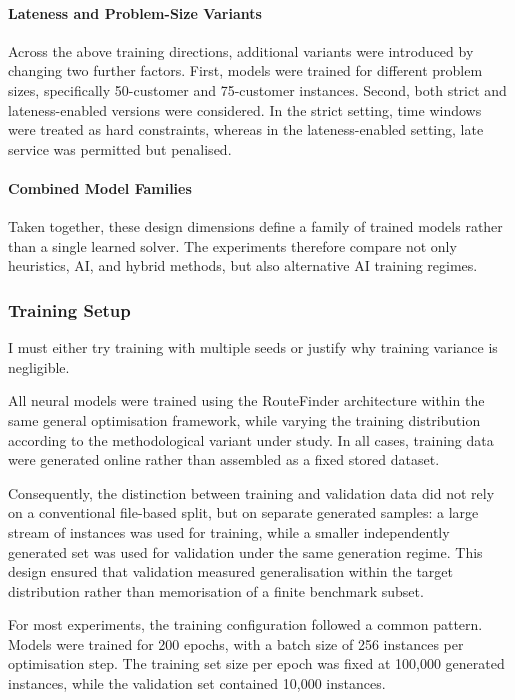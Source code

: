 \paragraph{Lateness and Problem-Size Variants}

Across the above training directions, additional variants were introduced by
changing two further factors. First, models were trained for different problem
sizes, specifically 50-customer and 75-customer instances. Second, both strict
and lateness-enabled versions were considered. In the strict setting, time
windows were treated as hard constraints, whereas in the lateness-enabled
setting, late service was permitted but penalised.

\paragraph{Combined Model Families}

Taken together, these design dimensions define a family of trained models rather
than a single learned solver. The experiments therefore compare not only
heuristics, AI, and hybrid methods, but also alternative AI training regimes.

\subsubsection{Training Setup}
{\color{red}I must either try training with multiple seeds or justify why
training variance is negligible.}

All neural models were trained using the RouteFinder architecture within the
same general optimisation framework, while varying the training distribution
according to the methodological variant under study. In all cases, training data
were generated online rather than assembled as a fixed stored dataset.

Consequently, the distinction between training and validation data did not rely
on a conventional file-based split, but on separate generated samples: a large
stream of instances was used for training, while a smaller independently
generated set was used for validation under the same generation regime. This
design ensured that validation measured generalisation within the target
distribution rather than memorisation of a finite benchmark subset.

For most experiments, the training configuration followed a common pattern.
Models were trained for 200 epochs, with a batch size of 256 instances per
optimisation step. The training set size per epoch was fixed at 100{,}000
generated instances, while the validation set contained 10{,}000 instances.

